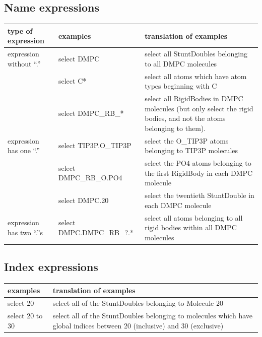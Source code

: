 \documentclass[]{book}
\begin{document}
\subsection{\label{section:name}Name expressions}

\begin{center}
\begin{tabular}{|llp{3in}|}
\hline
{\bf type of expression} & {\bf examples} & {\bf translation of
examples} \\
\hline
expression without ``.'' & select DMPC & select all StuntDoubles
belonging to all DMPC molecules \\
 & select C* & select all atoms which have atom types beginning with C
\\
 & select DMPC\_RB\_* & select all RigidBodies in DMPC molecules (but
only select the rigid bodies, and not the atoms belonging to them). \\
\hline
expression has one ``.'' & select TIP3P.O\_TIP3P & select the O\_TIP3P
atoms belonging to TIP3P molecules \\
 & select DMPC\_RB\_O.PO4 & select the PO4 atoms belonging to
the first 
RigidBody in each DMPC molecule \\
 & select DMPC.20 & select the twentieth StuntDouble in each DMPC
molecule \\
\hline
expression has two ``.''s & select DMPC.DMPC\_RB\_?.* &
select all atoms 
belonging to all rigid bodies within all DMPC molecules \\
\hline
\end{tabular}
\end{center}

\subsection{\label{section:index}Index expressions}

\begin{center}
\begin{tabular}{|lp{4in}|}
\hline
{\bf examples} & {\bf translation of examples} \\
\hline
select 20 & select all of the StuntDoubles belonging to Molecule 20 \\
select 20 to 30 & select all of the StuntDoubles belonging to
molecules which have global indices between 20 (inclusive) and 30
(exclusive) \\
\hline
\end{tabular}
\end{center}
\end{document}
